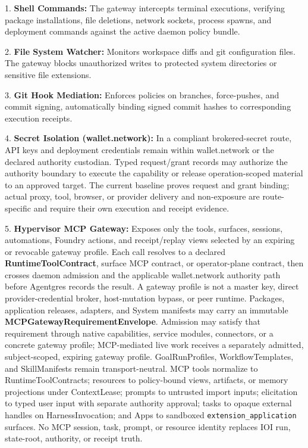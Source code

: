 \documentclass[
  11pt,
]{article}
\begin{document}
1. \textbf{Shell Commands:} The gateway intercepts terminal executions,
verifying package installations, file deletions, network sockets,
process spawns, and deployment commands against the active daemon policy
bundle.

2. \textbf{File System Watcher:} Monitors workspace diffs and git
configuration files. The gateway blocks unauthorized writes to protected
system directories or sensitive file extensions.

3. \textbf{Git Hook Mediation:} Enforces policies on branches,
force-pushes, and commit signing, automatically binding signed commit
hashes to corresponding execution receipts.

4. \textbf{Secret Isolation (wallet.network):} In a compliant brokered-secret
route, API keys and deployment credentials remain within wallet.network or the
declared authority custodian. Typed request/grant records may authorize the
authority boundary to execute the capability or release operation-scoped
material to an approved target. The current baseline proves request and grant
binding; actual proxy, tool, browser, or provider delivery and non-exposure are
route-specific and require their own execution and receipt evidence.

5. \textbf{Hypervisor MCP Gateway:} Exposes only the tools, surfaces,
sessions, automations, Foundry actions, and receipt/replay views selected by an
expiring or revocable gateway profile. Each call resolves to a declared
\textbf{RuntimeToolContract}, surface MCP contract, or operator-plane contract,
then crosses daemon admission and the applicable wallet.network authority path
before Agentgres records the result. A gateway profile is not a master key,
direct provider-credential broker, host-mutation bypass, or peer runtime.
Packages, application releases, adapters, and System manifests may carry an
immutable \textbf{MCPGatewayRequirementEnvelope}. Admission may satisfy that
requirement through native capabilities, service modules, connectors, or a
concrete gateway profile; MCP-mediated live work receives a separately
admitted, subject-scoped, expiring gateway profile. GoalRunProfiles,
WorkflowTemplates, and SkillManifests remain transport-neutral. MCP tools
normalize to RuntimeToolContracts; resources to policy-bound views, artifacts,
or memory projections under ContextLease; prompts to untrusted import inputs;
elicitation to typed user input with separate authority approval; tasks to
opaque external handles on HarnessInvocation; and Apps to sandboxed
\texttt{extension\_application} surfaces. No MCP session, task, prompt, or
resource identity replaces IOI run, state-root, authority, or receipt truth.
\end{document}
